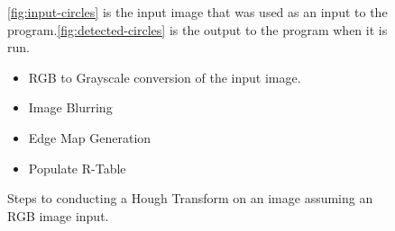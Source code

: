 \documentclass[conference]{IEEEtran}
\begin{document}
\begin{figure}%
  \centering
  \hfil
  \caption{\autoref{fig:input-circles} is the input image that was used as an input to the program.\autoref{fig:detected-circles} is the output to the program when it is run.}
\end{figure}


\begin{figure}[h]
  \begin{itemize}
    \item RGB to Grayscale conversion of the input image.
    \item Image Blurring 
    \item Edge Map Generation
    \item Populate R-Table
  \end{itemize}\caption{Steps to conducting a Hough Transform on an image assuming an RGB image input.}\label{figure:hough-transform-steps}
\end{figure}
\end{document}
